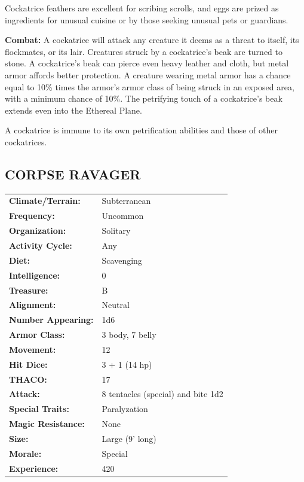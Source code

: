 \begin{multicols}{2}
Cockatrice feathers are excellent for scribing scrolls, and eggs are prized as ingredients for unusual cuisine or by those seeking unusual pets or guardians.

\textbf{Combat:} A cockatrice will attack any creature it deems as a threat to itself, its flockmates, or its lair. Creatures struck by a cockatrice's beak are turned to stone. A cockatrice's beak can pierce even heavy leather and cloth, but metal armor affords better protection. A creature wearing metal armor has a chance equal to 10\% times the armor's armor class of being struck in an exposed area, with a minimum chance of 10\%. The petrifying touch of a cockatrice's beak extends even into the Ethereal Plane.

A cockatrice is immune to its own petrification abilities and those of other cockatrices.

\noindent
\begin{minipage}{\columnwidth}

\vspace{1em}

\subsection{CORPSE RAVAGER}

\noindent
\begin{tabular}{p{}p{}}
\textbf{Climate/Terrain:}	& Subterranean \\
\textbf{Frequency:} 		& Uncommon \\
\textbf{Organization:} 		& Solitary \\
\textbf{Activity Cycle:} 	& Any \\
\textbf{Diet:} 				& Scavenging \\
\textbf{Intelligence:} 		& 0 \\
\textbf{Treasure:} 			& B \\
\textbf{Alignment:} 		& Neutral \\
\hline
\textbf{Number Appearing:} 	& 1d6 \\
\textbf{Armor Class:} 		& 3 body, 7 belly \\
\textbf{Movement:} 			& 12 \\
\textbf{Hit Dice:} 			& 3 + 1 (14 hp) \\
\textbf{THACO:} 			& 17 \\
\textbf{Attack:} 			& 8 tentacles (special) and bite 1d2 \\
\textbf{Special Traits:} 	& Paralyzation \\
\textbf{Magic Resistance:} 	& None \\
\textbf{Size:} 				& Large (9' long) \\
\textbf{Morale:} 			& Special \\
\textbf{Experience:} 		& 420 \\ %
\end{tabular}


\end{minipage}
\end{multicols}
